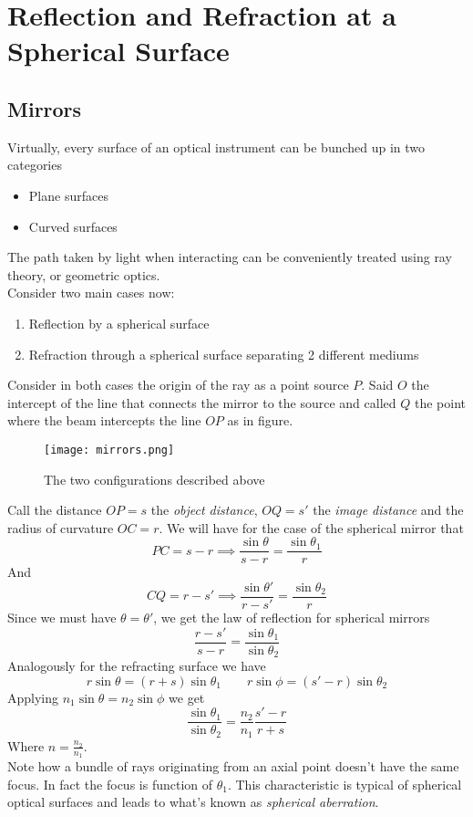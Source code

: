 \documentclass[../electromagnetism.tex]{subfiles}
\begin{document}
\section{Reflection and Refraction at a Spherical Surface}
\subsection{Mirrors}
Virtually, every surface of an optical instrument can be bunched up in two categories
\begin{itemize}
\item Plane surfaces
\item Curved surfaces
\end{itemize}
The path taken by light when interacting can be conveniently treated using ray theory, or geometric optics.\\
Consider two main cases now: 
\begin{enumerate}
\item Reflection by a spherical surface
\item Refraction through a spherical surface separating 2 different mediums
\end{enumerate}
Consider in both cases the origin of the ray as a point source $P$. Said $O$ the intercept of the line that connects the mirror to the source and called $Q$ the point where the beam intercepts the line $OP$ as in figure.
\begin{figure}[H]
	\centering
	\texttt{[image: mirrors.png]}
	\caption{The two configurations described above}
	\label{fig:curvedmirrors.gop}
\end{figure}
Call the distance $OP=s$ the \textit{object distance}, $OQ=s'$ the \textit{image distance} and the radius of curvature $OC=r$. We will have for the case of the spherical mirror that
\begin{equation*}
	PC=s-r\implies\frac{\sin\theta}{s-r}=\frac{\sin\theta_1}{r}
\end{equation*}
And
\begin{equation*}
	CQ=r-s'\implies\frac{\sin\theta'}{r-s'}=\frac{\sin\theta_2}{r}
\end{equation*}
Since we must have $\theta=\theta'$, we get the law of reflection for spherical mirrors
\begin{equation}
	\frac{r-s'}{s-r}=\frac{\sin\theta_1}{\sin\theta_2}
	\label{eq:refsph.gop}
\end{equation}
Analogously for the refracting surface we have 
\begin{equation*}
	r\sin\theta=(r+s)\sin\theta_1\qquad r\sin\phi=(s'-r)\sin\theta_2
\end{equation*}
Applying $n_1\sin\theta=n_2\sin\phi$ we get
\begin{equation}
	\frac{\sin\theta_1}{\sin\theta_2}=\frac{n_2}{n_1}\frac{s'-r}{r+s}
	\label{eq:trasph.gop}
\end{equation}
Where $n=\frac{n_2}{n_1}$.\\
Note how a bundle of rays originating from an axial point doesn't have the same focus. In fact the focus is function of $\theta_1$. This characteristic is typical of spherical optical surfaces and leads to what's known as \textit{spherical aberration}.\newpage
\end{document}
